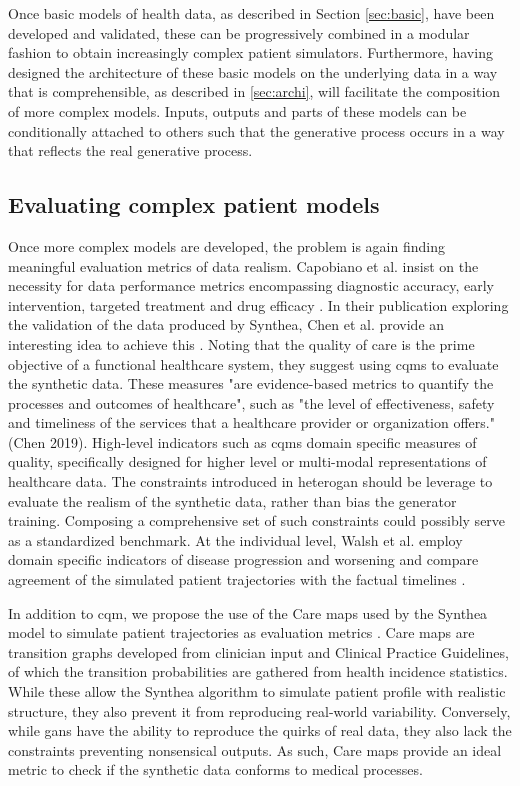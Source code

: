 Once basic models of health data, as described in Section \ref{sec:basic}, have been developed and validated, these can be progressively combined in a modular fashion to obtain increasingly complex patient simulators. Furthermore, having designed the architecture of these basic models on the underlying data in a way that is comprehensible, as described in \ref{sec:archi}, will facilitate the composition of more complex models. Inputs, outputs and parts of these models can be conditionally attached to others such that the generative process occurs in a way that reflects the real generative process.

\subsection{Evaluating complex patient models}
Once more complex models are developed, the problem is again finding meaningful evaluation metrics of data realism. Capobiano et al. insist on the necessity for data performance metrics encompassing diagnostic accuracy, early intervention, targeted treatment and drug efficacy \cite{Capobianco2020}. In their publication exploring the validation of the data produced by Synthea, Chen et al. provide an interesting idea to achieve this \cite{Chen_2019}. Noting that the quality of care is the prime objective of a functional healthcare system, they suggest using \glspl{cqm} to evaluate the synthetic data. These measures "are evidence-based metrics to quantify the processes and outcomes of healthcare", such as "the level of effectiveness, safety and timeliness of the services that a healthcare provider or organization offers."(Chen 2019). High-level indicators such as \glspl{cqm} domain specific measures of quality, specifically designed for higher level or multi-modal representations of healthcare data. The constraints introduced in \gls{heterogan} should be leverage to evaluate the realism of the synthetic data, rather than bias the generator training. Composing a comprehensive set of such constraints could possibly serve as a standardized benchmark.
At the individual level, Walsh et al. employ domain specific indicators of disease progression and worsening and compare agreement of the simulated patient trajectories with the factual timelines \cite{walsh2020generating}.\par
In addition to \gls{cqm}, we propose the use of the Care maps used by the Synthea model to simulate patient trajectories as evaluation metrics \cite{Walonoski_2017}. Care maps are transition graphs developed from clinician input and Clinical Practice Guidelines, of which the transition probabilities are gathered from health incidence statistics. While these allow the Synthea algorithm to simulate patient profile with realistic structure, they also prevent it from reproducing real-world variability. Conversely, while \glspl{gan} have the ability to reproduce the quirks of real data, they also lack the constraints preventing nonsensical outputs. As such, Care maps provide an ideal metric to check if the synthetic data conforms to medical processes.\par 
